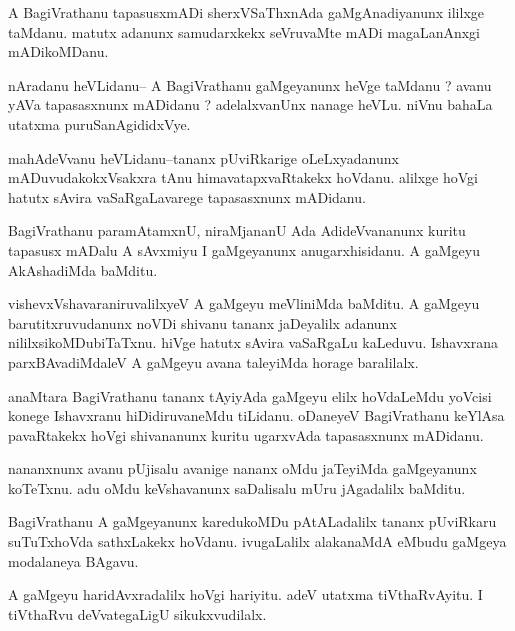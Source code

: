 \documentclass{article}
\begin{document}
\begin{mn}%
A BagiVrathanu tapasusxmADi sherxVSaThxnAda gaMgAnadiyanunx ililxge taMdanu. matutx adanunx 
samudarxkekx seVruvaMte mADi magaLanAnxgi mADikoMDanu.
\end{mn}

\begin{mn}%
nAradanu heVLidanu-- A BagiVrathanu gaMgeyanunx heVge taMdanu ? avanu yAVa tapasasxnunx 
mADidanu ? adelalxvanUnx nanage heVLu. niVnu bahaLa utatxma puruSanAgididxVye.
\end{mn}

\begin{mn}%
mahAdeVvanu heVLidanu--tananx pUviRkarige oLeLxyadanunx mADuvudakokxVsakxra tAnu 
himavatapxvaRtakekx hoVdanu. alilxge hoVgi hatutx sAvira vaSaRgaLavarege tapasasxnunx 
mADidanu.
\end{mn}

\begin{mn}%
BagiVrathanu paramAtamxnU, niraMjananU Ada AdideVvananunx kuritu tapasusx mADalu A sAvxmiyu 
I gaMgeyanunx anugarxhisidanu. A gaMgeyu AkAshadiMda baMditu.
\end{mn}

\begin{mn}%
vishevxVshavaraniruvalilxyeV A gaMgeyu meVliniMda baMditu. A gaMgeyu barutitxruvudanunx 
noVDi shivanu tananx jaDeyalilx adanunx nililxsikoMDubiTaTxnu. hiVge hatutx sAvira 
vaSaRgaLu kaLeduvu. Ishavxrana parxBAvadiMdaleV A gaMgeyu avana taleyiMda horage baralilalx.
\end{mn}

\begin{mn}%
anaMtara BagiVrathanu tananx tAyiyAda gaMgeyu elilx hoVdaLeMdu yoVcisi konege Ishavxranu 
hiDidiruvaneMdu tiLidanu. oDaneyeV BagiVrathanu keYlAsa pavaRtakekx hoVgi shivananunx kuritu 
ugarxvAda tapasasxnunx mADidanu.
\end{mn}

\begin{mn}%
nananxnunx avanu pUjisalu avanige nananx oMdu jaTeyiMda gaMgeyanunx koTeTxnu. adu oMdu 
keVshavanunx saDalisalu mUru jAgadalilx baMditu.
\end{mn}

\begin{mn}%
BagiVrathanu A gaMgeyanunx karedukoMDu pAtALadalilx tananx pUviRkaru suTuTxhoVda sathxLakekx 
hoVdanu. ivugaLalilx alakanaMdA eMbudu gaMgeya modalaneya BAgavu.
\end{mn}

\begin{mn}%
A gaMgeyu haridAvxradalilx hoVgi hariyitu. adeV utatxma tiVthaRvAyitu. I tiVthaRvu 
deVvategaLigU sikukxvudilalx. 
\end{mn}
\end{document}
